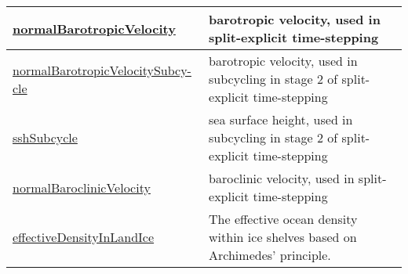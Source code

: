 {\begin{center}
\begin{longtable}{| p{2.0in} | p{4.0in} |}
    \hline
    \hyperref[subsec:var_sec_state_normalBarotropicVelocity]{normalBarotropicVelocity} & barotropic velocity, used in split-explicit time-stepping \\
    \hline
    \hyperref[subsec:var_sec_state_normalBarotropicVelocitySubcycle]{normalBarotropicVelocitySubcy-}\hyperref[subsec:var_sec_state_normalBarotropicVelocitySubcycle]{cle  }& barotropic velocity, used in subcycling in stage 2 of split-explicit time-stepping \\
    \hline
    \hyperref[subsec:var_sec_state_sshSubcycle]{sshSubcycle} & sea surface height, used in subcycling in stage 2 of split-explicit time-stepping \\
    \hline
    \hyperref[subsec:var_sec_state_normalBaroclinicVelocity]{normalBaroclinicVelocity} & baroclinic velocity, used in split-explicit time-stepping \\
    \hline
    \hyperref[subsec:var_sec_state_effectiveDensityInLandIce]{effectiveDensityInLandIce} & The effective ocean density within ice shelves based on Archimedes' principle. \\
    \hline
\end{longtable}
\end{center}
}
